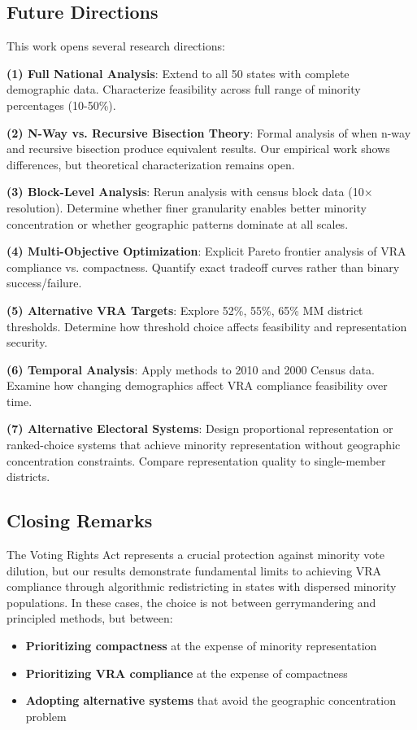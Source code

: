 \subsection{Future Directions}

This work opens several research directions:

\textbf{(1) Full National Analysis}: Extend to all 50 states with complete demographic data. Characterize feasibility across full range of minority percentages (10-50\%).

\textbf{(2) N-Way vs. Recursive Bisection Theory}: Formal analysis of when n-way and recursive bisection produce equivalent results. Our empirical work shows differences, but theoretical characterization remains open.

\textbf{(3) Block-Level Analysis}: Rerun analysis with census block data (10$\times$ resolution). Determine whether finer granularity enables better minority concentration or whether geographic patterns dominate at all scales.

\textbf{(4) Multi-Objective Optimization}: Explicit Pareto frontier analysis of VRA compliance vs. compactness. Quantify exact tradeoff curves rather than binary success/failure.

\textbf{(5) Alternative VRA Targets}: Explore 52\%, 55\%, 65\% MM district thresholds. Determine how threshold choice affects feasibility and representation security.

\textbf{(6) Temporal Analysis}: Apply methods to 2010 and 2000 Census data. Examine how changing demographics affect VRA compliance feasibility over time.

\textbf{(7) Alternative Electoral Systems}: Design proportional representation or ranked-choice systems that achieve minority representation without geographic concentration constraints. Compare representation quality to single-member districts.

\subsection{Closing Remarks}

The Voting Rights Act represents a crucial protection against minority vote dilution, but our results demonstrate fundamental limits to achieving VRA compliance through algorithmic redistricting in states with dispersed minority populations. In these cases, the choice is not between gerrymandering and principled methods, but between:

\begin{itemize}
\item \textbf{Prioritizing compactness} at the expense of minority representation
\item \textbf{Prioritizing VRA compliance} at the expense of compactness
\item \textbf{Adopting alternative systems} that avoid the geographic concentration problem
\end{itemize}

